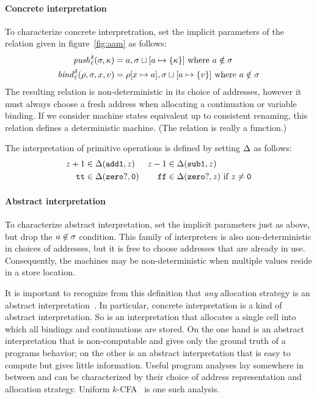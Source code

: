 \documentclass[preprint,onecolumn,9pt]{sigplanconf} %
\begin{document}
\paragraph{Concrete interpretation} To characterize concrete interpretration, set the implicit
parameters of the relation given in figure~\ref{fig:aam} as follows:
\begin{align*}
\mathit{push}_{\ell}^{\delta}(\sigma,\kappa) &= a,\sigma\sqcup[a\mapsto\{\kappa\}]
\mbox{ where }a \notin\sigma
\\
\mathit{bind}_{\ell}^{\delta}(\rho,\sigma,x,v) &= \rho[x\mapsto a],\sigma\sqcup[a\mapsto\{v\}]
\mbox{ where }a \notin\sigma
\end{align*}
The resulting relation is non-deterministic in its choice of
addresses, however it must always choose a fresh address when
allocating a continuation or variable binding.  If we consider machine
states equivalent up to consistent renaming, this relation defines
a deterministic machine.  (The relation is really a function.)

The interpretation of primitive operations is defined by setting
$\Delta$ as follows:
\begin{align*}
z+1 &\in \Delta({\tt add1},z) &
z-1 &\in \Delta({\tt sub1},z)\\
{\tt tt} &\in \Delta({\tt zero?},{\tt 0}) &
{\tt ff} &\in \Delta({\tt zero?},z)\text{ if }z\neq {\tt 0}\\
\end{align*}


\paragraph{Abstract interpretation} To characterize abstract interpretation, set the implicit
parameters just as above, but drop the $a \not\in \sigma$
condition.  This family of interpreters is also non-deterministic in
choices of addresses, but it is free to choose addresses that are
already in use.  Consequently, the machines may be non-deterministic
when multiple values reside in a store location.

It is important to recognize from this definition that \emph{any}
allocation strategy is an abstract
interpretation~\cite{dvanhorn:Might2009Posteriori}.  In particular,
concrete interpretation is a kind of abstract interpretation.  So is
an interpretation that allocates a single cell into which all bindings
and continuations are stored.  On the one hand is an abstract
interpretation that is non-computable and gives only the ground truth
of a programs behavior; on the other is an abstract interpretation
that is easy to compute but gives little information.  Useful program
analyses lay somewhere in between and can be characterized by their
choice of address representation and allocation strategy.  Uniform
\(k\)-CFA~\cite{dvanhorn:nielson-nielson-popl97} is one such analysis.
\end{document}

